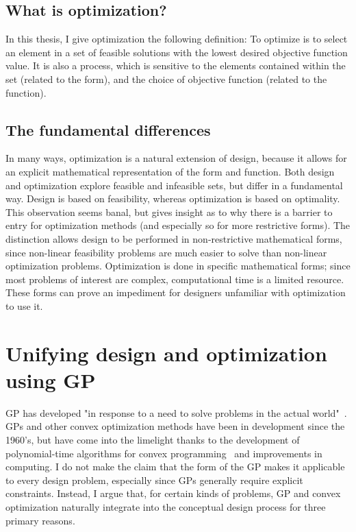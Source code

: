 \subsection{What is optimization?}

In this thesis, I give optimization the following definition: To optimize is to select an
element in a set of feasible solutions with the lowest desired objective
function value. It is also a process, which is sensitive to the elements contained within the set
(related to the form), and the choice of objective function (related to the
function).

\subsection{The fundamental differences}

In many ways, optimization is a natural extension of design, because it allows
for an explicit mathematical representation of the form and function. Both design and
optimization explore feasible and infeasible sets, but differ in a fundamental way.
Design is based on feasibility, whereas optimization is based on optimality.
This observation seems banal, but gives insight as to why there is a barrier
to entry for optimization methods (and especially so for more restrictive forms).
The distinction allows design to be performed
in non-restrictive mathematical forms, since non-linear feasibility problems are
much easier to solve than non-linear optimization problems. Optimization is
done in specific mathematical forms; since most problems of interest are complex,
computational time is a limited resource. These forms can prove
an impediment for designers unfamiliar with optimization to use it.

\section{Unifying design and optimization using GP}

\gls{GP} has developed "in response to a need to solve problems in the actual
world"~\cite{duffingp}. \gls{GP}s and other convex optimization methods have been
in development since the 1960's, but have come into the limelight thanks to the development of
polynomial-time algorithms for convex programming~\cite{interior_point} and
improvements in computing. I do not make
the claim that the form of the \gls{GP} makes it applicable to every design
problem, especially since \gls{GP}s generally require explicit constraints.
Instead, I argue that, for certain kinds of problems, \gls{GP} and convex
optimization naturally integrate into the conceptual design process
for three primary reasons.

